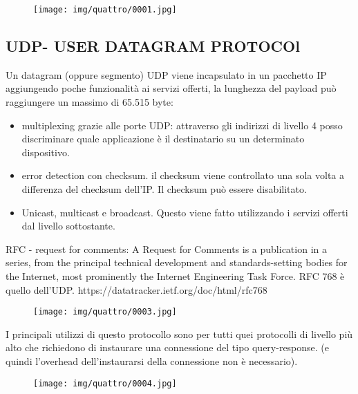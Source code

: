 \documentclass{article}
\begin{document}
\begin{figure}[!ht]
    \begin{center}
        \texttt{[image: img/quattro/0001.jpg]}         
    \end{center}
\end{figure}

\subsection{UDP- USER DATAGRAM PROTOCOl}
\noindent Un datagram (oppure segmento) UDP viene incapsulato in un pacchetto IP aggiungendo poche funzionalità ai servizi offerti, la lunghezza
del payload può raggiungere un massimo di 65.515 byte:
\begin{itemize}
    \item multiplexing grazie alle porte UDP: attraverso gli indirizzi di livello 4 posso discriminare quale applicazione è il destinatario su un determinato dispositivo.
    \item error detection con checksum. il checksum viene controllato una sola volta a differenza del checksum dell'IP. Il checksum può essere disabilitato.
    \item Unicast, multicast e broadcast. Questo viene fatto utilizzando i servizi offerti dal livello sottostante.
\end{itemize}

\noindent RFC - request for comments: A Request for Comments is a publication in a series, from the principal technical development and standards-setting bodies for the Internet, most 
prominently the Internet Engineering Task Force. RFC 768 è quello dell'UDP. https://datatracker.ietf.org/doc/html/rfc768
\medskip

\begin{figure}[!ht]
    \begin{center}
        \texttt{[image: img/quattro/0003.jpg]}         
    \end{center}
\end{figure}
\pagebreak

\noindent I principali utilizzi di questo protocollo sono per tutti quei protocolli di livello più alto che richiedono di instaurare una connessione del tipo query-response.
(e quindi l'overhead dell'instaurarsi della connessione non è necessario). 


\begin{figure}[!ht]
    \begin{center}
        \texttt{[image: img/quattro/0004.jpg]}         
    \end{center}
\end{figure}
\end{document}
